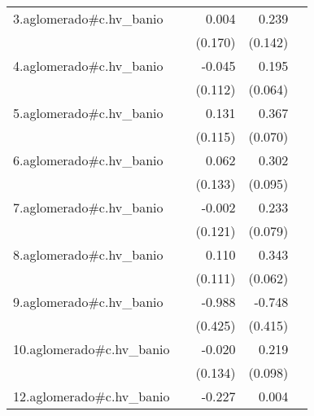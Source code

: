 {\begin{longtable}{l*{4}{D{.}{.}{-1}}}
\addlinespace
3.aglomerado#c.hv\_banio&                     &       0.004         &       0.239         &                     \\
            &                     &     (0.170)         &     (0.142)         &                     \\
\addlinespace
4.aglomerado#c.hv\_banio&                     &      -0.045         &       0.195\sym{**} &                     \\
            &                     &     (0.112)         &     (0.064)         &                     \\
\addlinespace
5.aglomerado#c.hv\_banio&                     &       0.131         &       0.367\sym{***}&                     \\
            &                     &     (0.115)         &     (0.070)         &                     \\
\addlinespace
6.aglomerado#c.hv\_banio&                     &       0.062         &       0.302\sym{**} &                     \\
            &                     &     (0.133)         &     (0.095)         &                     \\
\addlinespace
7.aglomerado#c.hv\_banio&                     &      -0.002         &       0.233\sym{**} &                     \\
            &                     &     (0.121)         &     (0.079)         &                     \\
\addlinespace
8.aglomerado#c.hv\_banio&                     &       0.110         &       0.343\sym{***}&                     \\
            &                     &     (0.111)         &     (0.062)         &                     \\
\addlinespace
9.aglomerado#c.hv\_banio&                     &      -0.988\sym{*}  &      -0.748         &                     \\
            &                     &     (0.425)         &     (0.415)         &                     \\
\addlinespace
10.aglomerado#c.hv\_banio&                     &      -0.020         &       0.219\sym{*}  &                     \\
            &                     &     (0.134)         &     (0.098)         &                     \\
\addlinespace
12.aglomerado#c.hv\_banio&                     &      -0.227         &       0.004         &                     \\

\end{longtable}}
